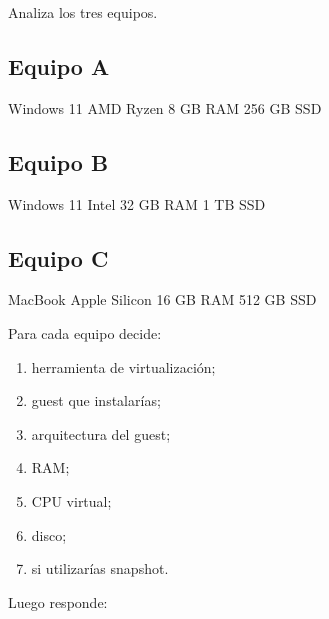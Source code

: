 \documentclass[
  spanish,
  letterpaper,
]{scrbook}
\newenvironment{Shaded}{\begin{snugshade}}{\end{snugshade}}
\newcommand{\NormalTok}[1]{\textcolor[rgb]{0.00,0.23,0.31}{#1}}
\providecommand{\tightlist}{%
  \setlength{\itemsep}{0pt}\setlength{\parskip}{0pt}}
\begin{document}
Analiza los tres equipos.

\subsection{Equipo A}\label{equipo-a}

\begin{Shaded}
\begin{Highlighting}[]
\NormalTok{Windows 11}
\NormalTok{AMD Ryzen}
\NormalTok{8 GB RAM}
\NormalTok{256 GB SSD}
\end{Highlighting}
\end{Shaded}

\subsection{Equipo B}\label{equipo-b}

\begin{Shaded}
\begin{Highlighting}[]
\NormalTok{Windows 11}
\NormalTok{Intel}
\NormalTok{32 GB RAM}
\NormalTok{1 TB SSD}
\end{Highlighting}
\end{Shaded}

\subsection{Equipo C}\label{equipo-c}

\begin{Shaded}
\begin{Highlighting}[]
\NormalTok{MacBook Apple Silicon}
\NormalTok{16 GB RAM}
\NormalTok{512 GB SSD}
\end{Highlighting}
\end{Shaded}

Para cada equipo decide:

\begin{enumerate}
\def\labelenumi{\arabic{enumi}.}
\tightlist
\item
  herramienta de virtualización;
\item
  guest que instalarías;
\item
  arquitectura del guest;
\item
  RAM;
\item
  CPU virtual;
\item
  disco;
\item
  si utilizarías snapshot.
\end{enumerate}

Luego responde:
\end{document}
